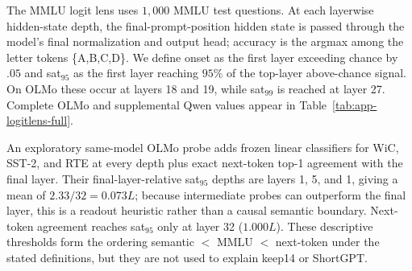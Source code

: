 The MMLU logit lens uses $1{,}000$ MMLU test questions. At each layerwise
hidden-state depth, the final-prompt-position hidden state is passed through the
model's final normalization and output head; accuracy is the argmax among the
letter tokens \{A,B,C,D\}. We define onset as the first layer exceeding chance
by $.05$ and sat$_{95}$ as the first layer reaching $95\%$ of the top-layer
above-chance signal. On OLMo these occur at layers 18 and 19, while sat$_{99}$
is reached at layer 27. Complete OLMo and supplemental Qwen values appear in
Table~\ref{tab:app-logitlens-full}.

An exploratory same-model OLMo probe adds frozen linear classifiers for WiC,
SST-2, and RTE at every depth plus exact next-token top-1 agreement with the
final layer.
Their final-layer-relative sat$_{95}$ depths are layers 1, 5, and 1, giving a
mean of $2.33/32=0.073L$; because intermediate probes can outperform the final
layer, this is a readout heuristic rather than a causal semantic boundary.
Next-token agreement reaches sat$_{95}$ only at layer 32 ($1.000L$). These
descriptive thresholds form the ordering semantic $<$ MMLU $<$ next-token under
the stated definitions, but they are not used to explain keep14 or ShortGPT.



